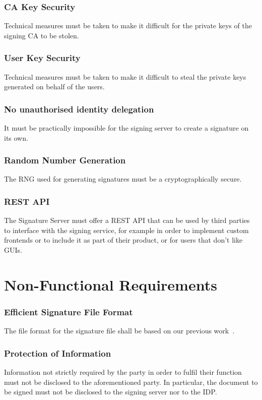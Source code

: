 \subsection{CA Key Security}
Technical measures must be taken to make it difficult for the private keys of the signing \gls{CA} to be stolen.

\subsection{User Key Security}
Technical measures must be taken to make it difficult to steal the private keys generated on behalf of the users.

\subsection{No unauthorised identity delegation}
It must be practically impossible for the signing server to create a signature on its own.

\subsection{Random Number Generation}
The \gls{RNG} used for generating signatures must be a cryptographically secure.

\subsection{REST API}
The Signature Server must offer a \gls{REST} \gls{API} that can be used by third parties to interface with the signing service,
for example in order to implement custom frontends or to include it as part of their product,
or for users that don't like \gls{GUI}s.

\chapter{Non-Functional Requirements}
\label{ch:nonfunctionalrequirements}

\subsection{Efficient Signature File Format}
The file format for the signature file shall be based on our previous work~\cite{projekt2}.

\subsection{Protection of Information}
Information not strictly required by the party in order to fulfil their function must not be disclosed to the aforementioned party.
In particular, the document to be signed must not be disclosed to the signing server nor to the \gls{IDP}.

